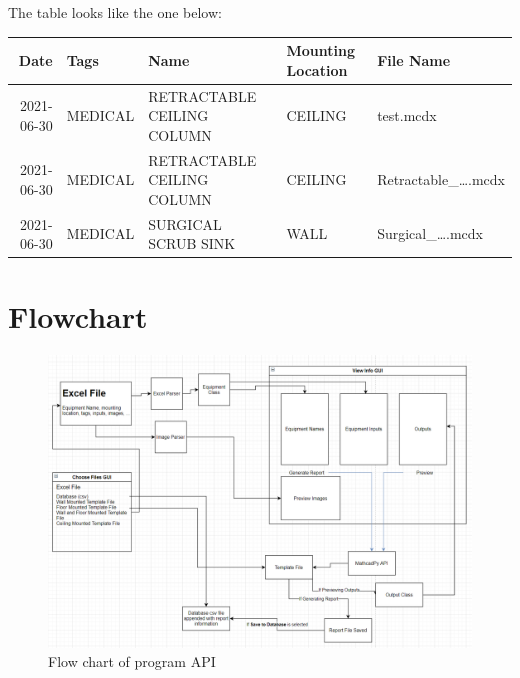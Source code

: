 \documentclass[11pt]{article}
\begin{document}
The table looks like the one below:
\begin{center}
\begin{tabular}{rllll}
\hline
Date & Tags & Name & Mounting Location & File Name\\
\hline
2021-06-30 & MEDICAL & RETRACTABLE CEILING COLUMN & CEILING & test.mcdx\\
2021-06-30 & MEDICAL & RETRACTABLE CEILING COLUMN & CEILING & Retractable\_\ldots{}.mcdx\\
2021-06-30 & MEDICAL & SURGICAL SCRUB SINK & WALL & Surgical\_\ldots{}.mcdx\\
\hline
\end{tabular}
\end{center}
\section{Flowchart}
\label{sec:org09e8b63}
\begin{figure}[htbp]
\centering
\includegraphics[width=.9\linewidth]{./dist/documentation/component_flowchart.png}
\caption{\label{fig:1}Flow chart of program API}
\end{figure}
\end{document}

